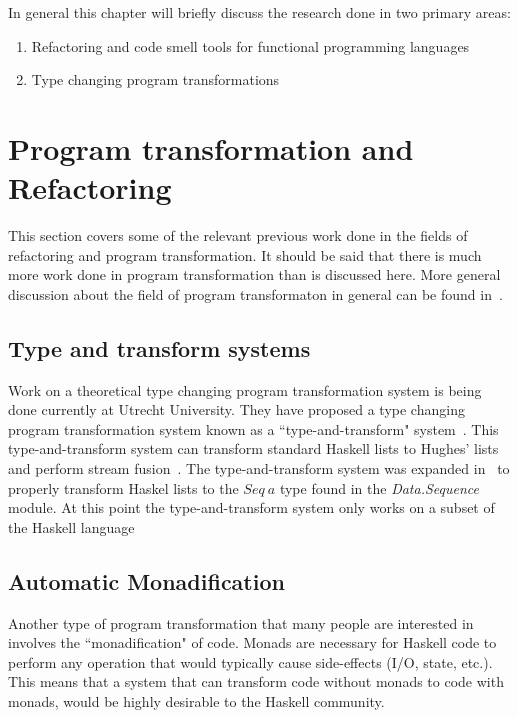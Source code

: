 In general this chapter will briefly discuss the research done in two primary areas:

\begin{enumerate}
\item Refactoring and code smell tools for functional programming languages
\item Type changing program transformations 
\end{enumerate}

\section{Program transformation and Refactoring}

This section covers some of the relevant previous work done in the fields of refactoring and program transformation. It should be said that there is much more work done in program transformation than is discussed here. More general discussion about the field of program transformaton in general can be found in~\citep{visserSurvey,transformationIntro}.

\subsection{Type and transform systems}

Work on a theoretical type changing program transformation system is being done currently at Utrecht University. They have proposed a type changing program transformation system known as a ``type-and-transform" system~\citep{typeAndTransform}. This type-and-transform system can transform standard Haskell lists to Hughes' lists and perform stream fusion~\citep{typeAndTransform}. The type-and-transform system was expanded in~\citep{typeAndTransformPatterns} to properly transform Haskel lists to the $Seq~a$ type found in the \textit{Data.Sequence} module. At this point the type-and-transform system only works on a subset of the Haskell language~\citep{typeAndTransform}

\subsection{Automatic Monadification}\label{erwigMonad}

Another type of program transformation that many people are interested in involves the ``monadification" of code. Monads are necessary for Haskell code to perform any operation that would typically cause side-effects (I/O, state, etc.). This means that a system that can transform code without monads to code with monads, would be highly desirable to the Haskell community.

